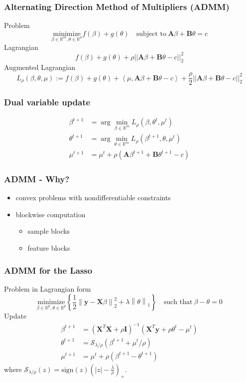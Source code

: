 \documentclass{beamer}
\newcommand{\R}{\mathbb{R}}
\newcommand{\Norm}[1]{\left\lVert#1\right\rVert}
\newcommand{\norm}[1]{\left\lvert#1\right\rvert}
\begin{document}
\begin{frame}
\frametitle{Alternating Direction Method of Multipliers (ADMM)}
Problem 
\[\underset{\beta\in\R^m, \theta\in\R^n}{\text{minimize}}f(\beta)+g(\theta)\quad\text{subject to}\ \mathbf{A}\beta+\mathbf{B}\theta=c\]
Lagrangian 
\[f(\beta)+g(\theta)+\rho||\mathbf{A}\beta+\mathbf{B}\theta-c||_2^2\]
Augmented Lagrangian
\[L_{\rho}(\beta,\theta,\mu):=f(\beta)+g(\theta)+\left\langle\mu,\mathbf{A}\beta+\mathbf{B}\theta-c\right\rangle+\frac{\rho}{2}||\mathbf{A}\beta+\mathbf{B}\theta-c||_2^2\]
\end{frame}


\begin{frame}
\frametitle{Dual variable update}
\begin{align*}
\beta^{t+1}&=\arg\min_{\beta\in\R^m}L_{\rho}(\beta,\theta^t,\mu^t)\\
\theta^{t+1}&=\arg\min_{\theta\in\R^m}L_{\rho}(\beta^{t+1},\theta,\mu^t)\\
\mu^{t+1}&=\mu^t+\rho(\mathbf{A}\beta^{t+1}+\mathbf{B}\theta^{t+1}-c)
\end{align*}
\end{frame}

\begin{frame}
\frametitle{ADMM - Why?}
\begin{itemize}
\item convex problems with nondifferentiable constraints
\item blockwise computation
	\begin{itemize}
	\item sample blocks
	\item feature blocks
	\end{itemize}
\end{itemize}
\end{frame}

\begin{frame}
\frametitle{ADMM for the Lasso}
Problem in Lagrangian form
\[\underset{\beta\in\R^p,\theta\in\R^p}{\text{minimize}}\left\{\frac{1}{2}\Norm{\mathbf{y}-\mathbf{X}\beta}_2^2+\lambda\Norm{\theta}_1\right\}\quad \text{such that}\ \beta-\theta=0 \]
Update
\begin{align*}
\beta^{t+1}&=(\mathbf{X}^T\mathbf{X}+\rho\mathbf{I})^{-1}(\mathbf{X}^T\mathbf{y}+\rho\theta^t-\mu^t)\\
\theta^{t+1}&=\mathcal{S}_{\lambda/\rho}(\beta^{t+1}+\mu^t/\rho)\\
\mu^{t+1}&=\mu^t+\rho(\beta^{t+1}-\theta^{t+1})
\end{align*}
where $\mathcal{S}_{\lambda/\rho}(z)=\text{sign}(z)(\norm{z}-\frac{\lambda}{\rho})_+$.
\end{frame}
\end{document}
